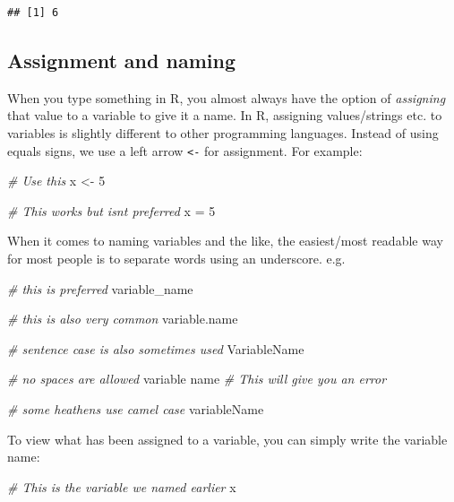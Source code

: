 \documentclass[
]{book}
\newenvironment{Shaded}{\begin{snugshade}}{\end{snugshade}}
\newcommand{\CommentTok}[1]{\textcolor[rgb]{0.56,0.35,0.01}{\textit{#1}}}
\newcommand{\DecValTok}[1]{\textcolor[rgb]{0.00,0.00,0.81}{#1}}
\newcommand{\NormalTok}[1]{#1}
\newcommand{\OtherTok}[1]{\textcolor[rgb]{0.56,0.35,0.01}{#1}}
\begin{document}
\begin{verbatim}
## [1] 6
\end{verbatim}

\subsection{Assignment and naming}\label{assignment-and-naming}

When you type something in R, you almost always have the option of \emph{assigning} that value to a variable to give it a name. In R, assigning values/strings etc. to variables is slightly different to other programming languages. Instead of using equals signs, we use a left arrow \texttt{\textless{}-} for assignment. For example:

\begin{Shaded}
\begin{Highlighting}[]
\CommentTok{\# Use this}
\NormalTok{x }\OtherTok{\textless{}{-}} \DecValTok{5}

\CommentTok{\# This works but isn\textquotesingle{}t preferred }
\NormalTok{x }\OtherTok{=} \DecValTok{5}
\end{Highlighting}
\end{Shaded}

When it comes to naming variables and the like, the easiest/most readable way for most people is to separate words using an underscore. e.g.

\begin{Shaded}
\begin{Highlighting}[]
\CommentTok{\# this is preferred}
\NormalTok{variable\_name}

\CommentTok{\# this is also very common}
\NormalTok{variable.name}

\CommentTok{\# sentence case is also sometimes used}
\NormalTok{VariableName}

\CommentTok{\# no spaces are allowed}
\NormalTok{variable name }\CommentTok{\# This will give you an error}

\CommentTok{\# some heathens use camel case}
\NormalTok{variableName}
\end{Highlighting}
\end{Shaded}

To view what has been assigned to a variable, you can simply write the variable name:

\begin{Shaded}
\begin{Highlighting}[]
\CommentTok{\# This is the variable we named earlier}
\NormalTok{x}
\end{Highlighting}
\end{Shaded}
\end{document}
